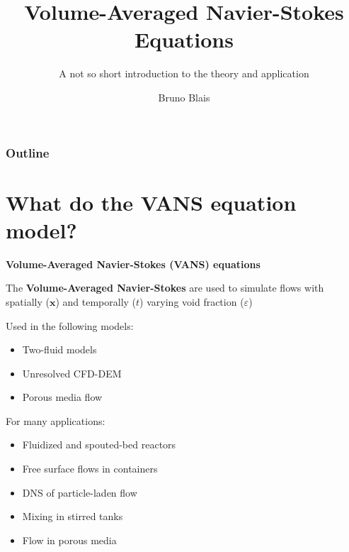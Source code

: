 \documentclass[c,11pt,xcolor=dvipsnames, aspectratio=169]{beamer}
\title{\textbf{Volume-Averaged Navier-Stokes Equations}}
\subtitle{A not so short introduction to the theory and application}
\author{Bruno Blais}
\begin{document}
{
\begin{frame}[noframenumbering]
  \titlepage
\end{frame}
}

\begin{frame}
	\frametitle{\textbf{Outline}}
	\tableofcontents
\end{frame}

\section{What do the VANS equation model?}


\begin{frame}{\textbf{Volume-Averaged Navier-Stokes (VANS) equations}}
	\visible<1->
	{\begin{shaded}
			The \textbf{Volume-Averaged Navier-Stokes} are used to simulate flows with spatially ($\bm{x}$) and temporally ($t$) varying void fraction ($\varepsilon$)
	\end{shaded}}
	
	\begin{minipage}[t]{0.48\linewidth}
		{
			\begin{block}{Used in the following models:}
				\begin{itemize}
					\item Two-fluid models
					\item Unresolved CFD-DEM
					\item Porous media flow
				\end{itemize}
			\end{block}
		}
	\end{minipage}%
	\hfill%
	\begin{minipage}[t]{0.48\linewidth}
		{
			\begin{block}{For many applications:}
				\begin{itemize}
					\item Fluidized and spouted-bed reactors
					\item Free surface flows in containers
					\item DNS of particle-laden flow
					\item Mixing in stirred tanks 
					\item Flow in porous media
				\end{itemize}
			\end{block}
		}
	\end{minipage}
\end{frame}
\end{document}
